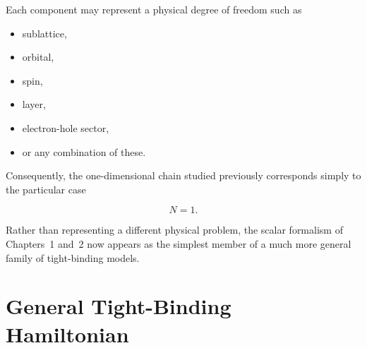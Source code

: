 Each component may represent a physical degree of freedom such as

\begin{itemize}

	\item sublattice,

	\item orbital,

	\item spin,

	\item layer,

	\item electron-hole sector,

	\item or any combination of these.

\end{itemize}

Consequently, the one-dimensional chain studied previously corresponds
simply to the particular case

\[
	N=1.
\]

Rather than representing a different physical problem, the scalar
formalism of Chapters~1 and~2 now appears as the simplest member of a
much more general family of tight-binding models.


\begin{center}
\end{center}


\section{General Tight-Binding Hamiltonian}

